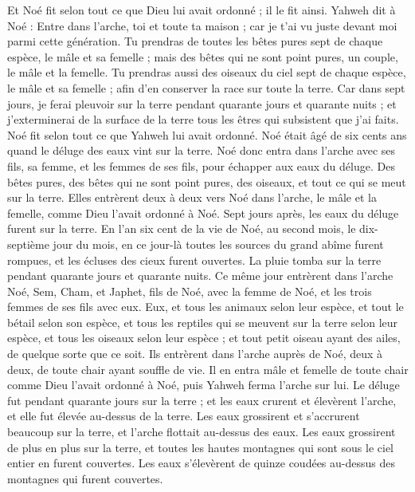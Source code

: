 \begin{multicols}{2}
Et Noé fit selon tout ce que Dieu lui avait ordonné ; il le fit ainsi.
\VerseOne{}Yahweh dit à Noé : Entre dans l’arche, toi et toute ta maison ; car je t'ai vu juste devant moi parmi cette génération. 
 Tu prendras de toutes les bêtes pures sept de chaque espèce, le mâle et sa femelle ; mais des bêtes qui ne sont point pures, un couple, le mâle et la femelle.
Tu prendras aussi des oiseaux du ciel sept de chaque espèce, le mâle et sa femelle ; afin d'en conserver la race sur toute la terre.
Car dans sept jours, je ferai pleuvoir sur la terre pendant quarante jours et quarante nuits ; et j'exterminerai de la surface de la terre tous les êtres qui subsistent que j'ai faits.
Noé fit selon tout ce que Yahweh lui avait ordonné.
Noé était âgé de six cents ans quand le déluge des eaux vint sur la terre.
Noé donc entra dans l’arche avec ses fils, sa femme, et les femmes de ses fils, pour échapper aux eaux du déluge.
Des bêtes pures, des bêtes qui ne sont point pures, des oiseaux, et tout ce qui se meut sur la terre.
Elles entrèrent deux à deux vers Noé dans l'arche, le mâle et la femelle, comme Dieu l’avait ordonné à Noé.
Sept jours après, les eaux du déluge furent sur la terre.
En l'an six cent de la vie de Noé, au second mois, le dix-septième jour du mois, en ce jour-là toutes les sources du grand abîme furent rompues, et les écluses des cieux furent ouvertes.
La pluie tomba sur la terre pendant quarante jours et quarante nuits.
Ce même jour entrèrent dans l’arche Noé, Sem, Cham, et Japhet, fils de Noé, avec la femme de Noé, et les trois femmes de ses fils avec eux.
Eux, et tous les animaux selon leur espèce, et tout le bétail selon son espèce, et tous les reptiles qui se meuvent sur la terre selon leur espèce, et tous les oiseaux selon leur espèce ; et tout petit oiseau ayant des ailes, de quelque sorte que ce soit.
Ils entrèrent dans l'arche auprès de Noé, deux à deux, de toute chair ayant souffle de vie.
Il en entra mâle et femelle de toute chair comme Dieu l’avait ordonné à Noé, puis Yahweh ferma l'arche sur lui.
Le déluge fut pendant quarante jours sur la terre ; et les eaux crurent et élevèrent l'arche, et elle fut élevée au-dessus de la terre.
Les eaux  grossirent et s'accrurent beaucoup sur la terre, et l'arche flottait au-dessus des eaux.
Les eaux grossirent de plus en plus sur la terre, et toutes les hautes montagnes qui sont sous le ciel entier en furent couvertes.
Les eaux s’élevèrent de quinze coudées au-dessus des montagnes  qui furent couvertes.

\end{multicols}
